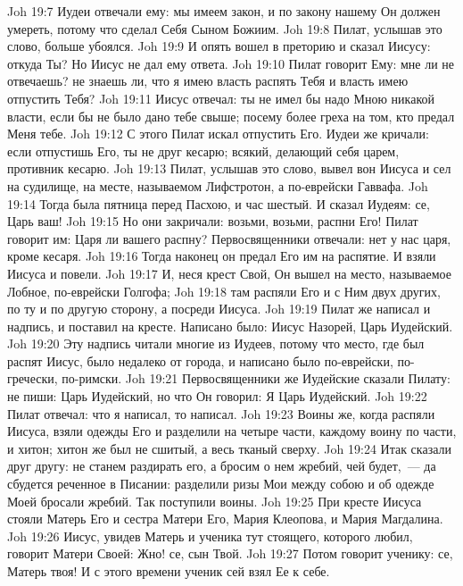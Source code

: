 \vs Joh 19:7 Иудеи отвечали ему: мы имеем закон, и по закону нашему Он должен умереть, потому что сделал Себя Сыном Божиим.
\vs Joh 19:8 Пилат, услышав это слово, больше убоялся.
\vs Joh 19:9 И опять вошел в преторию и сказал Иисусу: откуда Ты? Но Иисус не дал ему ответа.
\vs Joh 19:10 Пилат говорит Ему: мне ли не отвечаешь? не знаешь ли, что я имею власть распять Тебя и власть имею отпустить Тебя?
\vs Joh 19:11 Иисус отвечал: ты не имел бы надо Мною никакой власти, если бы не было дано тебе свыше; посему более греха на том, кто предал Меня тебе.
\vs Joh 19:12 С этого  Пилат искал отпустить Его. Иудеи же кричали: если отпустишь Его, ты не друг кесарю; всякий, делающий себя царем, противник кесарю.
\vs Joh 19:13 Пилат, услышав это слово, вывел вон Иисуса и сел на судилище, на месте, называемом Лифстротон, а по-еврейски Гаввафа.
\vs Joh 19:14 Тогда была пятница перед Пасхою, и час шестый. И сказал  Иудеям: се, Царь ваш!
\vs Joh 19:15 Но они закричали: возьми, возьми, распни Его! Пилат говорит им: Царя ли вашего распну? Первосвященники отвечали: нет у нас царя, кроме кесаря.
\rsbpar\vs Joh 19:16 Тогда наконец он предал Его им на распятие. И взяли Иисуса и повели.
\vs Joh 19:17 И, неся крест Свой, Он вышел на место, называемое Лобное, по-еврейски Голгофа;
\vs Joh 19:18 там распяли Его и с Ним двух других, по ту и по другую сторону, а посреди Иисуса.
\vs Joh 19:19 Пилат же написал и надпись, и поставил на кресте. Написано было: Иисус Назорей, Царь Иудейский.
\vs Joh 19:20 Эту надпись читали многие из Иудеев, потому что место, где был распят Иисус, было недалеко от города, и написано было по-еврейски, по-гречески, по-римски.
\vs Joh 19:21 Первосвященники же Иудейские сказали Пилату: не пиши: Царь Иудейский, но что Он говорил: Я Царь Иудейский.
\vs Joh 19:22 Пилат отвечал: что я написал, то написал.
\vs Joh 19:23 Воины же, когда распяли Иисуса, взяли одежды Его и разделили на четыре части, каждому воину по части, и хитон; хитон же был не сшитый, а весь тканый сверху.
\vs Joh 19:24 Итак сказали друг другу: не станем раздирать его, а бросим о нем жребий, чей будет,~--- да сбудется реченное в Писании: разделили ризы Мои между собою и об одежде Моей бросали жребий. Так поступили воины.
\rsbpar\vs Joh 19:25 При кресте Иисуса стояли Матерь Его и сестра Матери Его, Мария Клеопова, и Мария Магдалина.
\vs Joh 19:26 Иисус, увидев Матерь и ученика тут стоящего, которого любил, говорит Матери Своей: Жно! се, сын Твой.
\vs Joh 19:27 Потом говорит ученику: се, Матерь твоя! И с этого времени ученик сей взял Ее к себе.
